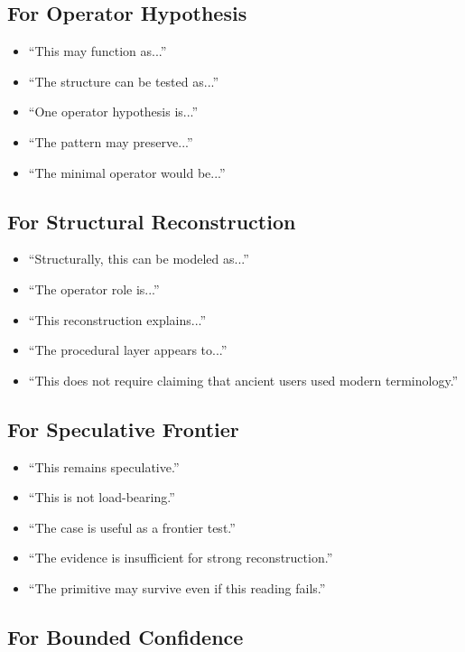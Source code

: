 \documentclass[11pt]{book}
\begin{document}
\subsection{For Operator Hypothesis}

\begin{itemize}
    \item ``This may function as...''
    \item ``The structure can be tested as...''
    \item ``One operator hypothesis is...''
    \item ``The pattern may preserve...''
    \item ``The minimal operator would be...''
\end{itemize}

\subsection{For Structural Reconstruction}

\begin{itemize}
    \item ``Structurally, this can be modeled as...''
    \item ``The operator role is...''
    \item ``This reconstruction explains...''
    \item ``The procedural layer appears to...''
    \item ``This does not require claiming that ancient users used modern terminology.''
\end{itemize}

\subsection{For Speculative Frontier}

\begin{itemize}
    \item ``This remains speculative.''
    \item ``This is not load-bearing.''
    \item ``The case is useful as a frontier test.''
    \item ``The evidence is insufficient for strong reconstruction.''
    \item ``The primitive may survive even if this reading fails.''
\end{itemize}

\subsection{For Bounded Confidence}
\end{document}
